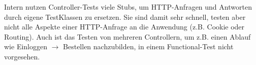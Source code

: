 Intern nutzen Controller-Tests viele Stubs, um HTTP-Anfragen und Antworten durch eigene TestKlassen zu ersetzen. Sie sind damit sehr schnell, testen aber nicht alle Aspekte einer HTTP-Anfrage an die Anwendung (z.B. Cookie oder Routing). Auch ist das Testen von mehreren Controllern, um z.B. einen Ablauf wie Einloggen $\to$ Bestellen nachzubilden, in einem Functional-Test nicht vorgesehen.
